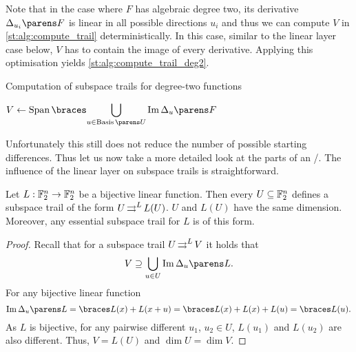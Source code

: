 Note that in the case where $F$ has algebraic degree two, its derivative~$\derive{u_i}{F}$ is linear in all possible directions $u_i$ and thus we can compute $V$ in \cref{st:alg:compute_trail} deterministically.
In this case, similar to the linear layer case below, $V$ has to contain the image of every derivative.
Applying this optimisation yields \cref{st:alg:compute_trail_deg2}.
\begin{algorithm}
\caption{Computation of subspace trails for degree-two functions}\label{st:alg:compute_trail_deg2}
\begin{algorithmic}[1]
    \Statex{}
        \State{}
    \EndIf{}
    \State{} $\displaystyle V \leftarrow \Span{\bigcup_{u \in \Basis{U}} \Im{\derive{u}{F}}}$
    \State{}
    \EndFunction{}
\end{algorithmic}
\end{algorithm}

Unfortunately this still does not reduce the number of possible starting differences.
Thus let us now take a more detailed look at the parts of an \SPN/.
The influence of the linear layer on subspace trails is straightforward.
\begin{proposition}\label{st:prop:llayer_st}
    Let $L : \mathbb{F}_2^n \to \mathbb{F}_2^n$ be a bijective linear function.
    Then every $U \subseteq \mathbb{F}_2^n$ defines a subspace trail of the form $U \operatorname*{\rightrightarrows}^{L}_{} L(U)$.
    $U$ and $L(U)$ have the same dimension.
    Moreover, any essential subspace trail for $L$ is of this form.
\end{proposition}

\begin{proof}
    Recall that for a subspace trail $U \operatorname*{\rightrightarrows}^{L}_{} V$ it holds that
    \begin{equation*}
        V \supseteq \bigcup_{u \in U} \Im{\derive{u}{L}}.
    \end{equation*}
    For any bijective linear function
    \begin{equation*}
        \Im{\derive{u}{L}} = \set{L(x) + L(x + u)} = \set{L(x) + L(x) + L(u)} = \set{L(u)}.
    \end{equation*}
    As $L$ is bijective, for any pairwise different $u_1$, $u_2 \in U$, $L(u_1)$ and $L(u_2)$ are also different.
    Thus, $V = L(U)$ and $\dim U = \dim V$.
\end{proof}

